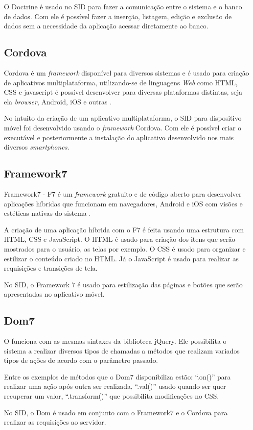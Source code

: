 O Doctrine é usado no SID para fazer a comunicação entre o sistema e o banco de dados. Com ele é possível fazer a inserção, listagem, edição e exclusão de dados sem a necessidade da aplicação acessar diretamente ao banco.

\subsection{Cordova}
Cordova é um \textit{framework} disponível para diversos sistemas e é usado para criação de aplicativos multiplataforma, utilizando-se de linguagens \textit{Web} como HTML, CSS e javascript é possível desenvolver para diversas plataformas distintas, seja ela \textit{browser}, Android, iOS e outras \citet{prezotto2017}.

No intuito da criação de um aplicativo multiplataforma, o SID para dispositivo móvel foi desenvolvido usando o \textit{framework} Cordova. Com ele é possível criar o executável e posteriormente a instalação do aplicativo desenvolvido nos mais diversos \textit{smartphones}.

\subsection{Framework7}
Framework7 - F7 é um \textit{framework} gratuito e de código aberto para desenvolver aplicações híbridas que funcionam em navegadores, Android e iOS com visões e estéticas nativas do sistema \citet{f72018}.

A criação de uma aplicação híbrida com o F7 é feita usando uma estrutura com HTML, CSS e JavaScript. O HTML é usado para criação dos itens que serão mostrados para o usuário, as telas por exemplo. O CSS é usado para organizar e estilizar o conteúdo criado no HTML. Já o JavaScript é usado para realizar as requisições e transições de tela.

No SID, o Framework 7 é usado para estilização das páginas e botões que serão apresentadas no aplicativo móvel.

\subsection{Dom7}
O \cite{dom7} funciona com as mesmas sintaxes da biblioteca jQuery. Ele possibilita o sistema a realizar diversos tipos de chamadas a métodos que realizam variados tipos de ações de acordo com o parâmetro passado.

Entre os exemplos de métodos que o Dom7 disponibiliza estão: ``.on()'' para realizar uma ação após outra ser realizada, ``.val()'' usado quando ser quer recuperar um valor, ``.transform()'' que possibilita modificações no CSS.

No SID, o Dom é usado em conjunto com o Framework7 e o Cordova para realizar as requisições ao servidor. 